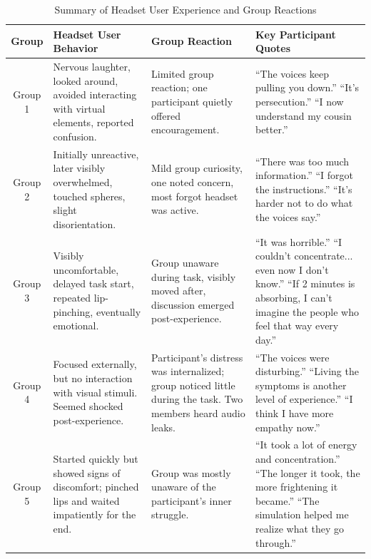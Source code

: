 \begin{table}[H]
\centering
\caption{Summary of Headset User Experience and Group Reactions}
\begin{tabular}{|c|p{4.2cm}|p{4.2cm}|p{4.8cm}|}
\hline
\textbf{Group} & \textbf{Headset User Behavior} & \textbf{Group Reaction} & \textbf{Key Participant Quotes} \\
\hline
Group 1 & Nervous laughter, looked around, avoided interacting with virtual elements, reported confusion. & Limited group reaction; one participant quietly offered encouragement. & “The voices keep pulling you down.” \newline “It’s persecution.” \newline “I now understand my cousin better.” \\
\hline
Group 2 & Initially unreactive, later visibly overwhelmed, touched spheres, slight disorientation. & Mild group curiosity, one noted concern, most forgot headset was active. & “There was too much information.” \newline “I forgot the instructions.” \newline “It's harder not to do what the voices say.” \\
\hline
Group 3 & Visibly uncomfortable, delayed task start, repeated lip-pinching, eventually emotional. & Group unaware during task, visibly moved after, discussion emerged post-experience. & “It was horrible.” \newline “I couldn't concentrate... even now I don't know.” \newline “If 2 minutes is absorbing, I can't imagine the people who feel that way every day.” \\
\hline
Group 4 & Focused externally, but no interaction with visual stimuli. Seemed shocked post-experience. & Participant’s distress was internalized; group noticed little during the task. Two members heard audio leaks. & “The voices were disturbing.” \newline “Living the symptoms is another level of experience.” \newline “I think I have more empathy now.” \\

\hline
Group 5 & Started quickly but showed signs of discomfort; pinched lips and waited impatiently for the end. & Group was mostly unaware of the participant’s inner struggle. & “It took a lot of energy and concentration.” \newline “The longer it took, the more frightening it became.” \newline “The simulation helped me realize what they go through.” \\

\hline
\end{tabular}
\label{tab:qual_summary}
\end{table}


